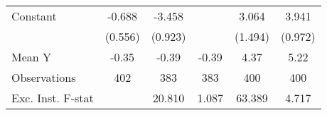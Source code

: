 {\begin{tabular}{l*{5}{c}}
\addlinespace
Constant            &      -0.688         &      -3.458\sym{***}&                     &       3.064\sym{*}  &       3.941\sym{***}\\
                    &     (0.556)         &     (0.923)         &                     &     (1.494)         &     (0.972)         \\
\midrule
Mean Y              &       -0.35         &       -0.39         &       -0.39         &        4.37         &        5.22         \\
Observations        &         402         &         383         &         383         &         400         &         400         \\
Exc. Inst. F-stat   &                     &      20.810         &       1.087         &      63.389         &       4.717         \\
\bottomrule
\end{tabular}
}
